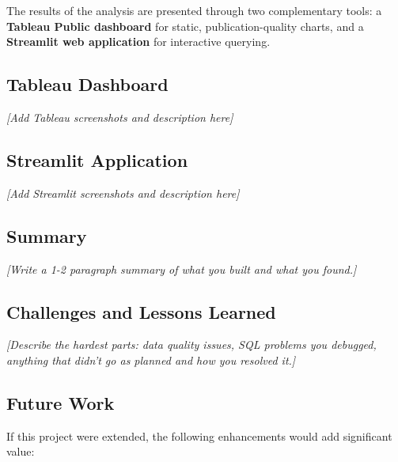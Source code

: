 
The results of the analysis are presented through two complementary tools:
a \textbf{Tableau Public dashboard} for static, publication-quality charts,
and a \textbf{Streamlit web application} for interactive querying.

\subsection{Tableau Dashboard}

\textit{[Add Tableau screenshots and description here]}

\subsection{Streamlit Application}

\textit{[Add Streamlit screenshots and description here]}


\subsection{Summary}

\textit{[Write a 1-2 paragraph summary of what you built and what you found.]}

\subsection{Challenges and Lessons Learned}

\textit{[Describe the hardest parts: data quality issues, SQL problems you debugged,
anything that didn't go as planned and how you resolved it.]}

\subsection{Future Work}

If this project were extended, the following enhancements would add significant value:

